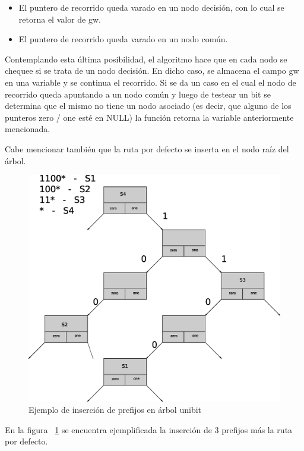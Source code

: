 \begin{itemize}
    	\item El puntero de recorrido queda varado en un nodo decisión, con lo cual se retorna el valor de gw.
    	\item El puntero de recorrido queda varado en un nodo común. 
\end{itemize}


Contemplando esta última posibilidad, el algoritmo hace que en cada nodo se chequee si se trata de un nodo decisión. En dicho caso, se almacena el campo gw en una variable y se continua el recorrido. Si se da un caso en el cual el nodo de recorrido queda apuntando a un nodo común y luego de testear un bit se determina que el mismo no tiene un nodo asociado (es decir, que alguno de los punteros zero / one esté en NULL) la función retorna la variable anteriormente mencionada. 

Cabe mencionar también que la ruta por defecto se inserta en el nodo raíz del árbol.

\begin{figure}[H]
  \centering
	\includegraphics[scale=0.50]{4-implementacion/graf/lluinsert09.eps}
  \caption{Ejemplo de inserción de prefijos en árbol unibit}
  \label{fig:lluinsert}
\end{figure}

En la figura ~\ref{fig:lluinsert} se encuentra ejemplificada la inserción de 3 prefijos más la ruta por defecto. 


